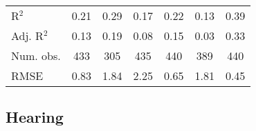 \documentclass[fullpage]{paper}
\begin{document}
\begin{center}
\begin{longtable}{l c c c c c c }
\hline
R$^2$       & 0.21         & 0.29           & 0.17          & 0.22         & 0.13          & 0.39          \\
Adj. R$^2$  & 0.13         & 0.19           & 0.08          & 0.15         & 0.03          & 0.33          \\
Num. obs.   & 433          & 305            & 435           & 440          & 389           & 440           \\
RMSE        & 0.83         & 1.84           & 2.25          & 0.65         & 1.81          & 0.45          \\
\end{longtable}
\end{center}
\subsection{ Hearing }
\end{document}
